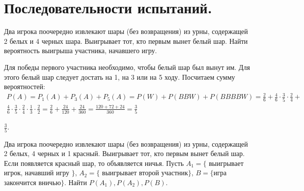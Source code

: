 
\section{Последовательности испытаний.}

\begin{task}{1}
Два игрока поочередно извлекают шары (без возвращения) из урны, содержащей 2 белых и 4 черных шара. 
Выигрывает тот, кто первым вынет белый шар. Найти вероятность выигрыша участника, начавшего игру.
\end{task}

\begin{solution}
Для победы первого участника необходимо, чтобы белый шар был вынут им. Для этого белый шар следует
достать на 1, на 3 или на 5 ходу. Посчитаем сумму вероятностей:
\begin{multline*}
  P(A) = P_1(A) + P_3(A) + P_5(A) = P(W) + P(BBW) + P(BBBBW) = 
  \frac{2}{6} + \frac{4}{6} \cdot \frac{3}{5} \cdot 
  \frac{2}{4} + \\ \frac{4}{6} \cdot  \frac{3}{5} \cdot \frac{2}{4} \cdot  \frac{1}{3} \cdot  \frac{2}{2} = 
  \frac{2}{6} + \frac{24}{120} + \frac{24}{360} = \frac{120 + 72 + 24}{360} = \frac{3}{5}
\end{multline*}
\end{solution}

\begin{result}
$\frac{3}{5}$.
\end{result}

\medskip
\begin{task}{2}
Два игрока поочередно извлекают шары (без возвращения) из урны, содержащей 2 белых, 4 черных и 1
красный. Выигрывает тот, кто первым вынет белый шар. Если появляется красный шар, то объявляется ничья.
Пусть $A_1 = \{$ выигрывает игрок, начавший игру $\}$, $A_2 = \{$ выигрывает второй участник$\}$, 
$B = \{$игра закончится вничью$\}$. Найти  $P(A_1), P(A_2), P(B)$.
\end{task}


